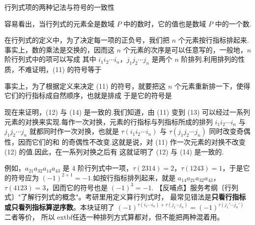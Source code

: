 \begin{fdeep}{行列式项的两种记法与符号的一致性}

容易看出，当行列式的元素全是数域 $P$ 中的数时，它的值也是数域 $P$ 中的一个数.

在行列式的定义中，为了决定每一项的正负号，我们把 $n$ 个元素按行指标排起来.事实上，数的乘法是交换的，因而这 $n$ 个元素的次序是可以任意写的，一般地，$n$ 阶行列式中的项可以写成
其中 $i_1i_2\cdots i_n$，$j_1j_2\cdots j_n$ 是两个 $n$ 阶排列.利用排列的性质，不难证明，(11) 的符号等于

事实上，为了根据定义来决定 (11) 的符号，就要把这 $n$ 个元素重新排一下，使得它们的行指标成自然顺序，也就是排成
于是它的符号是

现在来证明，(12) 与 (14) 是一致的.我们知道，由 (11) 变到 (13) 可以经过一系列元素的对换来实现.每作一次对换，元素的行指标与列指标所成的排列 $i_1i_2\cdots i_n$ 与 $j_1j_2\cdots j_n$ 就都同时作一次对换，也就是 $\tau(i_1i_2\cdots i_n)$ 与 $\tau(j_1j_2\cdots j_n)$ 同时改变奇偶性，因而它们的和
的奇偶性不改变.这就是说，对 (11) 作一次元素的对换不改变 (12) 的值.因此，在一系列对换之后有
这就证明了 (12) 与 (14) 是一致的.

例如，$a_{21}a_{32}a_{14}a_{43}$ 是 4 阶行列式中一项，$\tau(2314)=2$，$\tau(1243)=1$，于是它的符号应为 $(-1)^{2+1}=-1$.如按行指标排列起来，就是 $a_{14}a_{21}a_{32}a_{43}$，$\tau(4123)=3$，因而它的符号也是 $(-1)^{3}=-1$.
【反哺点】服务考纲〔行列式〕"了解行列式的概念"。考研里用定义算行列式时，
最常见错法是\textbf{只看行指标或只看列指标算逆序数}。本块证明了
$(-1)^{\tau(i_1\cdots i_n)+\tau(j_1\cdots j_n)}=(-1)^{\tau(j_1'\cdots j_n')}$ 二者等价，
所以	extbf{任选一种排列方式算都对，但不能把两种混着用}。
\end{fdeep}

